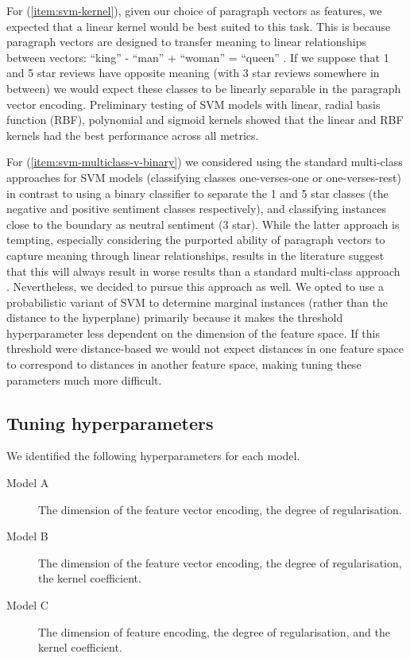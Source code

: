 \documentclass[11pt]{article}
\begin{document}
For (\ref{item:svm-kernel}), given our choice of paragraph vectors as features, we expected that a linear kernel would be best suited to this task. This is because paragraph vectors are designed to transfer meaning to linear relationships between vectors: ``king'' - ``man'' + ``woman'' = ``queen'' \cite{le_distributed_2014}. If we suppose that 1 and 5 star reviews have opposite meaning (with 3 star reviews somewhere in between) we would expect these classes to be linearly separable in the paragraph vector encoding. Preliminary testing of SVM models with linear, radial basis function (RBF), polynomial and sigmoid kernels showed that the linear and RBF kernels had the best performance across all metrics.

For (\ref{item:svm-multiclass-v-binary}) we considered using the standard multi-class approaches for SVM models (classifying classes one-verses-one or one-verses-rest) in contrast to using a binary classifier to separate the 1 and 5 star classes (the negative and positive sentiment classes respectively), and classifying instances close to the boundary as neutral sentiment (3 star). While the latter approach is tempting, especially considering the purported ability of paragraph vectors to capture meaning through linear relationships, results in the literature suggest that this will always result in worse results than a standard multi-class approach \cite{koppel_importance_2006}. Nevertheless, we decided to pursue this approach as well. We opted to use a probabilistic variant of SVM to determine marginal instances (rather than the distance to the hyperplane) primarily because it makes the threshold hyperparameter less dependent on the dimension of the feature space. If this threshold were distance-based we would not expect distances in one feature space to correspond to distances in another feature space, making tuning these parameters much more difficult.

\subsection{Tuning hyperparameters}
We identified the following hyperparameters for each model. 
\begin{description}
	\item[Model A] The dimension of the feature vector encoding, the degree of regularisation.
	\item[Model B] The dimension of the feature vector encoding, the degree of regularisation, the kernel coefficient. 
	\item[Model C]  The dimension of feature encoding, the degree of regularisation, and the kernel coefficient.
\end{description}
\end{document}
